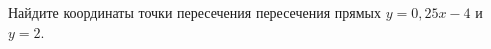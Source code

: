 \begin{ex}
	\begin{condition}
		Найдите координаты точки пересечения пересечения прямых \( y=0,25x-4 \) и \( y=2 \).
	\end{condition}
\end{ex}